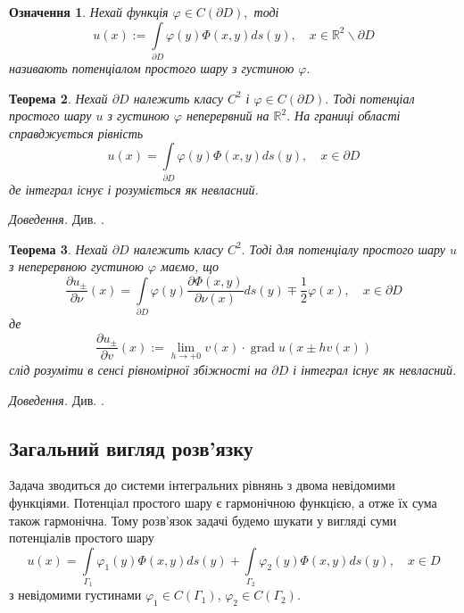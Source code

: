\documentclass[14pt,a4paper]{extarticle}
\newcounter{e}
\newtheorem{theorem}{Теорема}[section]
\newtheorem{defn}[theorem]{Означення}
\newcommand{\proof}{\textit{Доведення. \space}}
\numberwithin{equation}{section}
\numberwithin{figure}{section}
\newcommand{\intl}{\int\limits}
\begin{document}
 \begin{defn}
	\label{single-layer-potential}
	 Нехай функція $\varphi \in C(\partial D),$ тоді
	 \begin{equation}
		 u(x):=\intl_{\partial D} \varphi(y) \Phi(x, y) d s(y), \quad x \in \mathbb{R}^{2} \backslash \partial D
	 \end{equation}
	 називають потенціалом простого шару з густиною $\varphi .$
 \end{defn}

 \begin{theorem}
 	 \label{potential-on-bound} 
	 Нехай $\partial D$ належить класу $C^{2}$ і $\varphi \in C(\partial D) .$ Тоді потенціал простого шару $u$ з густиною $\varphi$ неперервний на $\mathbb{R}^{2} .$ На границі області справджується рівність
	 \begin{equation}
		 u(x)=\intl_{\partial D} \varphi(y) \Phi(x, y) d s(y), \quad x \in \partial D
	 \end{equation}
	 де інтеграл існує і розуміється як невласний.
 \end{theorem}
 \proof Див. \cite{kress2012linear}.
 
 \begin{theorem}
 	 \label{potential-partial-derevative}
	 Нехай $\partial D$ належить класу $C^{2} .$ Тоді для потенціалу простого шару $u$ з неперервною густиною $\varphi$ маємо, що
	 \begin{equation}
		 \frac{\partial u_{\pm}}{\partial \nu}(x) =
		 \intl_{\partial D} \varphi(y) \frac{\partial \Phi(x, y)}{\partial \nu(x)} d s(y) \mp \frac{1}{2} \varphi(x),
		 \quad x \in \partial D
	 \end{equation}
	 де
	 \begin{equation}
	 	\frac{\partial u_{\pm}}{\partial v}(x):=\lim _{h \rightarrow+0} v(x) \cdot \operatorname{grad} u(x \pm h v(x))
	 \end{equation}
	 слід розуміти в сенсі рівномірної збіжності на $\partial D$ і інтеграл існує як невласний.
 \end{theorem}
 \proof Див. \cite{kress2012linear}.
 
 \subsection{Загальний вигляд розв'язку}
 
 Задача \boundprob \space зводиться до системи інтегральних рівнянь з двома невідомими функціями.
 Потенціал простого шару є гармонічною функцією, а отже їх сума також гармонічна.
 Тому розв'язок задачі \boundprob \space будемо шукати у вигляді суми потенціалів простого шару
 \begin{equation}
	 \label{potentials-sum-solution}
	 u(x) 
	 = \intl_{\Gamma_1} \varphi_1(y) \Phi(x, y) d s(y)
	 + \intl_{\Gamma_2} \varphi_2(y) \Phi(x, y) d s(y)
	 , \quad x \in D
 \end{equation}
 з невідомими густинами $\varphi_1 \in C(\Gamma_{1}) $, $\varphi_2 \in C(\Gamma_{2})$.
 
\end{document}

